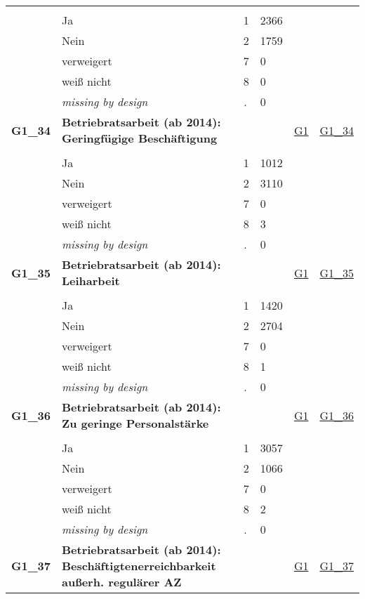 \begin{longtable}{| L{2.45cm} | L{6cm} | C{1.5cm} | R{1cm} | C{2.25cm} | C{2.25cm} |}
   &  &  &  &  &  \\ 
   & Ja & 1 & 2366 &  &  \\ 
   & Nein & 2 & 1759 &  &  \\ 
   & verweigert & 7 & 0 &  &  \\ 
   & weiß nicht & 8 & 0 &  &  \\ 
   & \textit{missing by design} & \textit{.} & 0 &  &  \\ 
   \midrule
\textbf{G1\_34}\label{var:G1:34} & \textbf{Betriebratsarbeit (ab 2014): Geringfügige Beschäftigung} &  &  & \hyperref[G1]{G1} & \hyperref[var:suf:G1:34]{G1\_34} \\ 
   &  &  &  &  &  \\ 
   & Ja & 1 & 1012 &  &  \\ 
   & Nein & 2 & 3110 &  &  \\ 
   & verweigert & 7 & 0 &  &  \\ 
   & weiß nicht & 8 & 3 &  &  \\ 
   & \textit{missing by design} & \textit{.} & 0 &  &  \\ 
   \midrule
\textbf{G1\_35}\label{var:G1:35} & \textbf{Betriebratsarbeit (ab 2014): Leiharbeit} &  &  & \hyperref[G1]{G1} & \hyperref[var:suf:G1:35]{G1\_35} \\ 
   &  &  &  &  &  \\ 
   & Ja & 1 & 1420 &  &  \\ 
   & Nein & 2 & 2704 &  &  \\ 
   & verweigert & 7 & 0 &  &  \\ 
   & weiß nicht & 8 & 1 &  &  \\ 
   & \textit{missing by design} & \textit{.} & 0 &  &  \\ 
   \midrule
\textbf{G1\_36}\label{var:G1:36} & \textbf{Betriebratsarbeit (ab 2014): Zu geringe Personalstärke} &  &  & \hyperref[G1]{G1} & \hyperref[var:suf:G1:36]{G1\_36} \\ 
   &  &  &  &  &  \\ 
   & Ja & 1 & 3057 &  &  \\ 
   & Nein & 2 & 1066 &  &  \\ 
   & verweigert & 7 & 0 &  &  \\ 
   & weiß nicht & 8 & 2 &  &  \\ 
   & \textit{missing by design} & \textit{.} & 0 &  &  \\ 
   \midrule
\textbf{G1\_37}\label{var:G1:37} & \textbf{Betriebratsarbeit (ab 2014): Beschäftigtenerreichbarkeit außerh. regulärer AZ} &  &  & \hyperref[G1]{G1} & \hyperref[var:suf:G1:37]{G1\_37} \\ 

\end{longtable}
